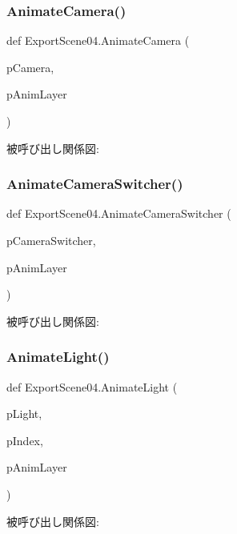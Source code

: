 \subsubsection{\texorpdfstring{Animate\+Camera()}{AnimateCamera()}}
{\footnotesize\ttfamily def Export\+Scene04.\+Animate\+Camera (\begin{DoxyParamCaption}\item[{}]{p\+Camera,  }\item[{}]{p\+Anim\+Layer }\end{DoxyParamCaption})}

被呼び出し関係図\+:
\mbox{\label{namespace_export_scene04_a4813e9ae82c7f9deeb75f0234e0c2112}} 
\subsubsection{\texorpdfstring{Animate\+Camera\+Switcher()}{AnimateCameraSwitcher()}}
{\footnotesize\ttfamily def Export\+Scene04.\+Animate\+Camera\+Switcher (\begin{DoxyParamCaption}\item[{}]{p\+Camera\+Switcher,  }\item[{}]{p\+Anim\+Layer }\end{DoxyParamCaption})}

被呼び出し関係図\+:
\mbox{\label{namespace_export_scene04_a1abb47a8f7578c8bfee5c85daeda8a1e}} 
\subsubsection{\texorpdfstring{Animate\+Light()}{AnimateLight()}}
{\footnotesize\ttfamily def Export\+Scene04.\+Animate\+Light (\begin{DoxyParamCaption}\item[{}]{p\+Light,  }\item[{}]{p\+Index,  }\item[{}]{p\+Anim\+Layer }\end{DoxyParamCaption})}

被呼び出し関係図\+:
\mbox{\label{namespace_export_scene04_ac899932cc8680a48e3556538129d8e1d}} 
